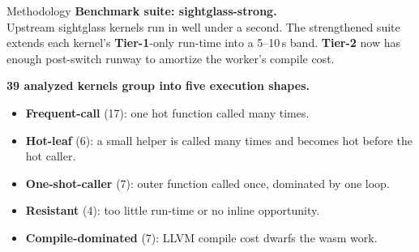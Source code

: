 \documentclass[aspectratio=169,11pt]{beamer}
\newcommand{\tone}{\textbf{\textcolor{tier1}{Tier-1}}}
\newcommand{\ttwo}{\textbf{\textcolor{tier2}{Tier-2}}}
\begin{document}
\begin{frame}{Methodology}
  \small
  \textbf{Benchmark suite: sightglass-strong.}\\
  Upstream sightglass kernels run in well under a second.
  The strengthened suite extends each kernel's \tone{}-only run-time into a 5--10\,s band.
  \ttwo{} now has enough post-switch runway to amortize the worker's compile cost.

  \vspace{0.4em}
  \textbf{39 analyzed kernels group into five execution shapes.}
  \begin{itemize}\setlength{\itemsep}{1pt}
    \item \textbf{Frequent-call} (17): one hot function called many times.
    \item \textbf{Hot-leaf} (6): a small helper is called many times and becomes hot before the hot caller.
    \item \textbf{One-shot-caller} (7): outer function called once, dominated by one loop.
    \item \textbf{Resistant} (4): too little run-time or no inline opportunity.
    \item \textbf{Compile-dominated} (7): LLVM compile cost dwarfs the wasm work.
  \end{itemize}
\end{frame}
\end{document}
